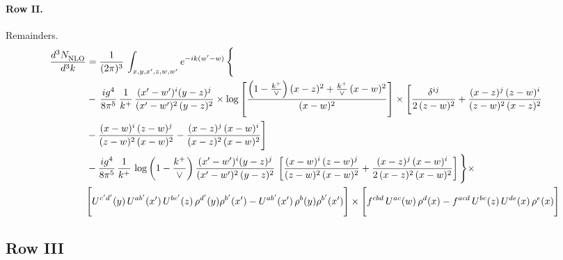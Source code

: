 \documentclass[10pt]{article}
\numberwithin{equation}{section}
\begin{document}
\paragraph{Row II.}
Remainders.
\begin{align}
     \frac{d^{3}N_{\rm NLO}^{\rm}}{d^{3}k}  & =   \frac{1}{(2\pi)^{3}}\, \int_{x,y,x',z,w,w^{\prime}} e^{-ik(w^{\prime}-w)}\, \Bigg\{\notag \\
& -\,\frac{ig^{4}}{8\pi^{5}}\,\frac{1}{k^{+}}\,\frac{(x'-w')^{i}(y-z)^{j}}{(x'-w')^{2}\,(y-z)^{2}}\times \log{\left[\frac{\left(1-\frac{k^{+}}{\vee}\right)(x-z)^{2}+\frac{k^{+}}{\vee}\,(x-w)^{2}}{(x-w)^{2}}\right]}\times \Bigg[\frac{\delta^{ij}}{2\,(z-w)^{2}}+\frac{(x-z)^{j}\,(z-w)^{i}}{(z-w)^{2}\,(x-z)^{2}}\notag \\ & -\frac{(x-w)^{i}\,(z-w)^{j}}{(z-w)^{2}\,(x-w)^{2}}-\frac{(x-z)^{j}\,(x-w)^{i}}{(x-z)^{2}\,(x-w)^{2}}\Bigg] \notag \\
&  -\frac{ig^{4}}{8\pi^{5}}\,\frac{1}{k^{+}}\,\log{\left(1-\frac{k^{+}}{\vee}\right)}\,\frac{(x'-w')^{i}(y-z)^{j}}{(x'-w')^{2}\,(y-z)^{2}}\,\left[\frac{(x-w)^{i}\,(z-w)^{j}}{(z-w)^{2}\,(x-w)^{2}}+\frac{(x-z)^{j}\,(x-w)^{i}}{2\,(x-z)^{2}\, (x-w)^{2}}\right]\Bigg\}\times \notag \\ & \Bigg[U^{c'd'}(y)\,U^{ab'}(x')\,U^{bc'}(z)\,\rho^{d'}(y)\rho^{b'}(x')-U^{ab'}(x')\,\rho^{b}(y)\rho^{b'}(x')\Bigg]\times\Bigg[f^{cbd}\,U^{ac}(w)\,\rho^{d}(x)-f^{acd}\, U^{bc}(z)\,U^{de}(x)\,\rho^{e}(x)\Bigg] \label{eq:R:G3II}
\end{align}

\subsection{Row III}
\end{document}
